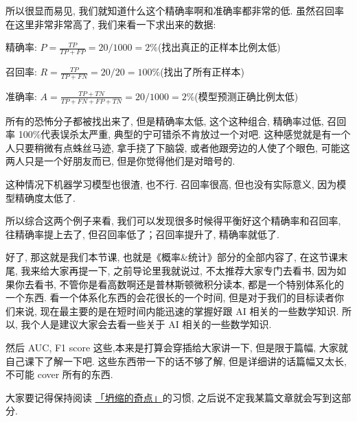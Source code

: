所以很显而易见, 我们就知道什么这个精确率啊和准确率都非常的低. 虽然召回率在这里非常非常高了, 我们来看一下求出来的数据: 

精确率: $P=\frac{TP}{TP+FP} =20/1000 = 2\%$(找出真正的正样本比例太低)

召回率: $R=\frac{TP}{TP+FN} = 20/20 = 100\%$(找出了所有正样本)

准确率: $A=\frac{TP+TN}{TP+FN+FP+TN} = 20/1000 = 2\%$(模型预测正确比例太低)

所有的恐怖分子都被找出来了, 但是精确率太低, 这个这种组合, 精确率过低, 召回率 100\%代表误杀太严重, 典型的宁可错杀不肯放过一个对吧. 这种感觉就是有一个人只要稍微有点蛛丝马迹, 拿手挠了下脑袋, 或者他跟旁边的人使了个眼色, 可能这两人只是一个好朋友而已, 但是你觉得他们是对暗号的. 

这种情况下机器学习模型也很渣, 也不行. 召回率很高, 但也没有实际意义, 因为模型精确度太低了. 

所以综合这两个例子来看, 我们可以发现很多时候得平衡好这个精确率和召回率, 往精确率提上去了, 但召回率低了；召回率提升了, 精确率就低了. 

好了, 那这就是我们本节课, 也就是《概率\&统计》部分的全部内容了, 在这节课末尾, 我来给大家再提一下, 之前导论里我就说过, 不太推荐大家专门去看书, 因为如果你去看书, 不管你是看高数啊还是普林斯顿微积分读本, 都是一个特别体系化的一个东西. 看一个体系化东西的会花很长的一个时间, 但是对于我们的目标读者你们来说, 现在最主要的是在短时间内能迅速的掌握好跟 AI 相关的一些数学知识. 所以, 我个人是建议大家会去看一些关于 AI 相关的一些数学知识. 

然后 AUC, F1 score 这些,本来是打算会穿插给大家讲一下, 但是限于篇幅, 大家就自己课下了解一下吧. 这些东西带一下的话不够了解, 但是详细讲的话篇幅又太长, 不可能 cover 所有的东西. 

大家要记得保持阅读 \href{http://mp.weixin.qq.com/mp/homepage?__biz=MzA4NzE4MDQzMg==&hid=1&sn=4662a6b4305960a2e30a70c26fcefa53&scene=18#wechat_redirect}{「坍缩的奇点」}的习惯, 之后说不定我某篇文章就会写到这部分. 
